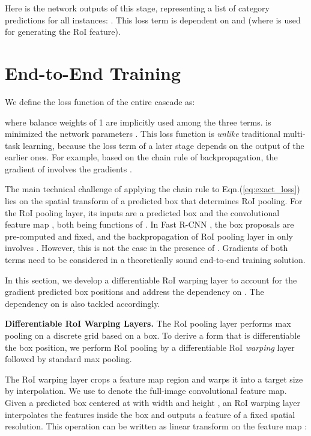 \documentclass[10pt,twocolumn,letterpaper]{article}
\begin{document}
Here  is the network outputs of this stage, representing a list of category predictions for all instances: . This loss term is dependent on  and  (where  is used for generating the RoI feature).

\section{End-to-End Training}
\label{sec:training}

We define the loss function of the entire cascade as:

where balance weights of 1 are implicitly used among the three terms.
 is minimized \wrt the network parameters .
This loss function is \emph{unlike} traditional multi-task learning, because the loss term of a later stage depends on the output of the earlier ones. For example, based on the chain rule of backpropagation, the gradient of  involves the gradients \wrt .

The main technical challenge of applying the chain rule to Eqn.(\ref{eq:exact_loss}) lies on the spatial transform of a predicted box  that determines RoI pooling. For the RoI pooling layer, its inputs are a predicted box  and the convolutional feature map , both being functions of . In Fast R-CNN \cite{Girshick2015}, the box proposals are pre-computed and fixed, and the backpropagation of RoI pooling layer in \cite{Girshick2015} only involves . However, this is not the case in the presence of . Gradients of both terms need to be considered in a theoretically sound end-to-end training solution.

In this section, we develop a differentiable RoI warping layer to account for the gradient \wrt predicted box positions and address the dependency on . The dependency on  is also tackled accordingly.

\vspace{.5em}
\noindent\textbf{Differentiable RoI Warping Layers.}
The RoI pooling layer \cite{Girshick2015,He2014} performs max pooling on a discrete grid based on a box. To derive a form that is differentiable \wrt the box position, we perform RoI pooling by a differentiable RoI \emph{warping} layer followed by standard max pooling.

The RoI warping layer crops a feature map region and warps it into a target size by interpolation.
We use  to denote the full-image convolutional feature map. Given a predicted box  centered at  with width  and height , an RoI warping layer interpolates the features inside the box and outputs a feature of a fixed spatial resolution. This operation can be written as linear transform on the feature map :
\end{document}
